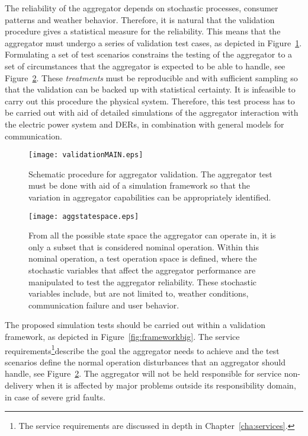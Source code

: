 The reliability of the aggregator depends on stochastic processes, \eg consumer patterns and weather behavior. Therefore, it is natural that the validation procedure gives a statistical measure for the reliability. This means that the aggregator must undergo a series of validation test cases, as depicted in Figure~\ref{fig:MAINframework}. Formulating a set of test scenarios constrains the testing of the aggregator to a set of circumstances that the aggregator is expected to be able to handle, see Figure~\ref{fig:aggstatespace}. These \emph{treatments} must be reproducible and with sufficient sampling so that the validation can be backed up with statistical certainty. It is infeasible to carry out this procedure the physical system. Therefore, this test process has to be carried out with aid of detailed simulations of the aggregator interaction with the electric power system and DERs, in combination with general models for communication.
\begin{figure}[htbp!]
\centering
\texttt{[image: validationMAIN.eps]}
\caption{Schematic procedure for aggregator validation. The aggregator test must be done with aid of a simulation framework so that the variation in aggregator capabilities can be appropriately identified.}
\label{fig:MAINframework}
\end{figure}

\begin{figure}[hpb!]
\centering
\texttt{[image: aggstatespace.eps]}
\caption{From all the possible state space the aggregator can operate in, it is only a subset that is considered nominal operation. Within this nominal operation, a test operation space is defined, where the stochastic variables that affect the aggregator performance are manipulated to test the aggregator reliability. These stochastic variables include, but are not limited to, weather conditions, communication failure and user behavior.}
\label{fig:aggstatespace}
\end{figure}

The proposed simulation tests should be carried out within a validation framework, as depicted in Figure~\ref{fig:frameworkbig}. The service requirements\footnote{The service requirements are discussed in depth in Chapter~\ref{cha:services}.}describe the goal the aggregator needs to achieve and the test scenarios define the normal operation disturbances that an aggregator should handle, see Figure~\ref{fig:aggstatespace}. The aggregator will not be held responsible for service non-delivery when it is affected by major problems outside its responsibility domain, \eg in case of severe grid faults. %

